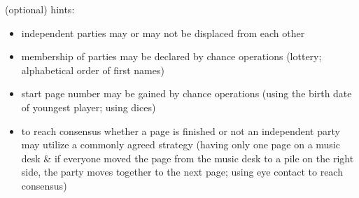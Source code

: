 \documentclass[12pt,a4paper,ngerman]{article}
\begin{document}
\vspace{1.5cm}




\newpage

\begin{minipage}[b]{.7\textwidth}

\vspace{1.5cm}
\begin{footnotesize}

    {\small (optional) hints:}

    \begin{itemize}

        \item{independent parties may or may not be displaced from each other}

        \item{membership of parties may be declared by chance operations (lottery; alphabetical order of first names)}

        \item{start page number may be gained by chance operations (using the birth date of youngest player; using dices)}

        \item{
                to reach consensus whether a page is finished or not an independent party may utilize a commonly agreed strategy %
                (having only one page on a music desk \& if everyone moved the page from the music desk to a pile on the right side, the party moves together to the next page;
                using eye contact to reach consensus)
            }

    \end{itemize}

\end{footnotesize}


\end{minipage}%




% 
% 
% 
\end{document}
